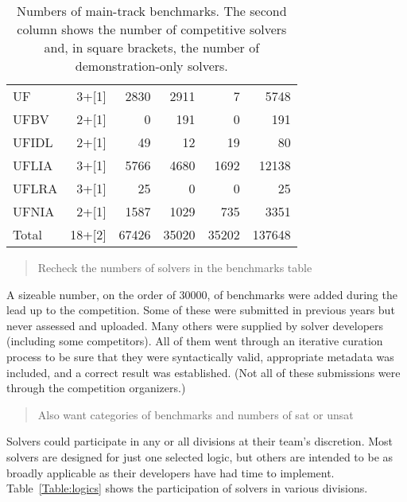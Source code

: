 \documentclass[twosize,11pt]{article}
\newcommand{\comment}[2]{\begin{quote}\sc #1\marginpar{\textcolor{red}{$\ast^{\mbox{#2}}$}}\end{quote}}
\newcommand{\davidc}[1]{\comment{#1}{DC}}
\begin{document}
\begin{table}
\begin{tabular}{|l|r|r|r|r|r|}
UF & 3+[1] & 2830 & 2911 & 7 & 5748 \\
UFBV & 2+[1] & 0 & 191 & 0 & 191 \\
UFIDL & 2+[1] & 49 & 12 & 19 & 80 \\
UFLIA & 3+[1] & 5766 & 4680 & 1692 & 12138 \\
UFLRA & 3+[1] & 25 & 0 & 0 & 25\\
UFNIA & 2+[1] & 1587 & 1029 & 735 & 3351 \\
\hline
Total & 18+[2] & 67426 & 35020 & 35202 & 137648 \\
\hline
\end{tabular}
\vspace{.2in}
\caption{Numbers of main-track benchmarks. The second column shows the number of competitive solvers and, in square brackets, the number of demonstration-only solvers.}
\label{Table:benchmarks}
\end{table}

\davidc{Recheck the numbers of solvers in the benchmarks table}

A sizeable number, on the order of 30000, of benchmarks were added during the lead up to the competition. Some of these were submitted in previous years but never assessed and uploaded. Many others were supplied by solver developers (including some competitors). All of them went through an iterative curation process to be sure that they were syntactically valid, appropriate metadata was included, and a correct result was established. (Not all of these submissions were through the competition organizers.)

\davidc{Also want categories of benchmarks and numbers of sat or unsat}

Solvers could participate in any or all divisions at their team's discretion. Most solvers are designed for just one selected logic, but others are intended to be as broadly applicable as their developers have had time to implement. Table~\ref{Table:logics} shows the participation of solvers in various divisions.
\end{document}
